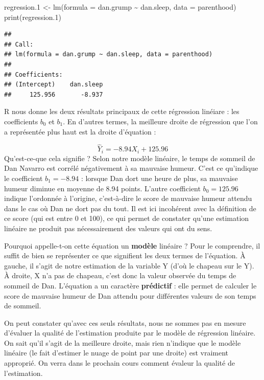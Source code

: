 \documentclass[
]{book}
\newenvironment{Shaded}{\begin{snugshade}}{\end{snugshade}}
\newcommand{\AttributeTok}[1]{\textcolor[rgb]{0.77,0.63,0.00}{#1}}
\newcommand{\FloatTok}[1]{\textcolor[rgb]{0.00,0.00,0.81}{#1}}
\newcommand{\FunctionTok}[1]{\textcolor[rgb]{0.00,0.00,0.00}{#1}}
\newcommand{\NormalTok}[1]{#1}
\newcommand{\OtherTok}[1]{\textcolor[rgb]{0.56,0.35,0.01}{#1}}
\newcommand{\SpecialCharTok}[1]{\textcolor[rgb]{0.00,0.00,0.00}{#1}}
\begin{document}
\begin{Shaded}
\begin{Highlighting}[]
\NormalTok{regression}\FloatTok{.1} \OtherTok{\textless{}{-}} \FunctionTok{lm}\NormalTok{(}\AttributeTok{formula =}\NormalTok{ dan.grump }\SpecialCharTok{\textasciitilde{}}\NormalTok{ dan.sleep, }\AttributeTok{data =}\NormalTok{ parenthood)}
\FunctionTok{print}\NormalTok{(regression}\FloatTok{.1}\NormalTok{)}
\end{Highlighting}
\end{Shaded}

\begin{verbatim}
## 
## Call:
## lm(formula = dan.grump ~ dan.sleep, data = parenthood)
## 
## Coefficients:
## (Intercept)    dan.sleep  
##     125.956       -8.937
\end{verbatim}

R nous donne les deux résultats principaux de cette régression linéiare : les coefficients \(b_0\) et \(b_1\). En d'autres termes, la meilleure droite de régression que l'on a représentée plus haut est la droite d'équation :

\[ \hat{Y}_i = -8.94 X_i + 125.96 \]
Qu'est-ce-que cela signifie ? Selon notre modèle linéaire, le temps de sommeil de Dan Navarro est corrélé négativement à sa mauvaise humeur. C'est ce qu'indique le coefficient \(b_1 = -8.94\) : lorsque Dan dort une heure de plus, sa mauvaise humeur diminue en moyenne de 8.94 points. L'autre coefficient \(b_0 = 125.96\) indique l'ordonnée à l'origine, c'est-à-dire le score de mauvaise humeur attendu dans le cas où Dan ne dort pas du tout. Il est ici incohérent avec la définition de ce score (qui est entre 0 et 100), ce qui permet de constater qu'une estimation linéaire ne produit pas nécessairement des valeurs qui ont du sens.

Pourquoi appelle-t-on cette équation un \textbf{modèle} linéaire ? Pour le comprendre, il suffit de bien se représenter ce que signifient les deux termes de l'équation. À gauche, il s'agit de notre estimation de la variable Y (d'où le chapeau sur le Y). À droite, X n'a pas de chapeau, c'est donc la valeur observée du temps de sommeil de Dan. L'équation a un caractère \textbf{prédictif} : elle permet de calculer le score de mauvaise humeur de Dan attendu pour différentes valeurs de son temps de sommeil.

On peut constater qu'avec ces seuls résultats, nous ne sommes pas en mesure d'évaluer la qualité de l'estimation produite par le modèle de régression linéaire. On sait qu'il s'agit de la meilleure droite, mais rien n'indique que le modèle linéaire (le fait d'estimer le nuage de point par une droite) est vraiment approprié. On verra dans le prochain cours comment évaleur la qualité de l'estimation.
\end{document}
